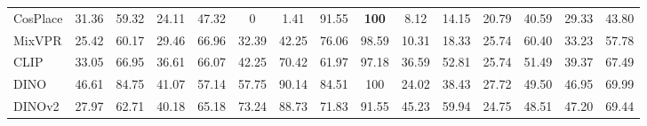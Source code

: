 \begin{table}[H]
{\begin{tabular}{lcccccccccccccc}
CosPlace                               & 31.36                         & 59.32                        & 24.11                            & 47.32                            & 0                              & 1.41                          & 91.55                           & \textbf{100}                            & 8.12                         & 14.15                        & 20.79                                                   & 40.59                                                   & 29.33                    & 43.80                    \\
MixVPR                                 & 25.42                         & 60.17                        & 29.46                            & 66.96                            & 32.39                          & 42.25                         & 76.06                           & 98.59                          & 10.31                        & 18.33                        & 25.74                                                   & 60.40                                                   & 33.23                    & 57.78                    \\ \hline
CLIP                                   & 33.05                         & 66.95                        & 36.61                            & 66.07                            & 42.25                          & 70.42                         & 61.97                           & 97.18                          & 36.59                        & 52.81                        & 25.74                                                   & 51.49                                                   & 39.37                    & 67.49                    \\
DINO                                   & 46.61                         & 84.75                        & 41.07                            & 57.14                            & 57.75                          & 90.14                         & 84.51                           & 100                            & 24.02                        & 38.43                        & 27.72                                                   & 49.50                                                   & 46.95                    & 69.99                    \\
DINOv2                                 & 27.97                         & 62.71                        & 40.18                            & 65.18                            & 73.24                          & 88.73                         & 71.83                           & 91.55                          & 45.23                        & 59.94                        & 24.75                                                   & 48.51                                                   & 47.20                    & 69.44                    \\

\end{tabular}}
\end{table}
